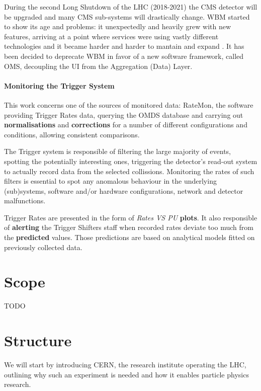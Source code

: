 During the second Long Shutdown of the LHC (2018-2021) the CMS detector will be upgraded and many CMS sub-systems will drastically change. WBM started to show its age and problems: it unexpectedly and heavily grew with new features, arriving at a point where services were using vastly different technologies and it became harder and harder to mantain and expand \cite{CMSWBMreview}. It has been decided to deprecate \cite{upgradewbmoms} WBM in favor of a new software framework, called OMS, decoupling the UI from the Aggregation (Data) Layer.

\paragraph{Monitoring the Trigger System}

This work concerns one of the sources of monitored data: RateMon, the software providing Trigger Rates data, querying the OMDS database and carrying out \textbf{normalisations} and \textbf{corrections} for a number of different configurations and conditions, allowing consistent comparisons.

The Trigger system is responsible of filtering the large majority of events, spotting the potentially interesting ones, triggering the detector's read-out system to actually record data from the selected collissions. Monitoring the rates of such filters is essential to spot any anomalous behaviour in the underlying (sub)systems, software and/or hardware configurations, network and detector malfunctions.

Trigger Rates are presented in the form of \textit{Rates VS PU} \textbf{plots}. It also responsible of \textbf{alerting} the Trigger Shifters staff when recorded rates deviate too much from the \textbf{predicted} values. Those predictions are based on analytical models fitted on previously collected data.

\section{Scope}

TODO

\section{Structure}

We will start by introducing CERN, the research institute operating the LHC, outlining why such an experiment is needed and how it enables particle physics research.

